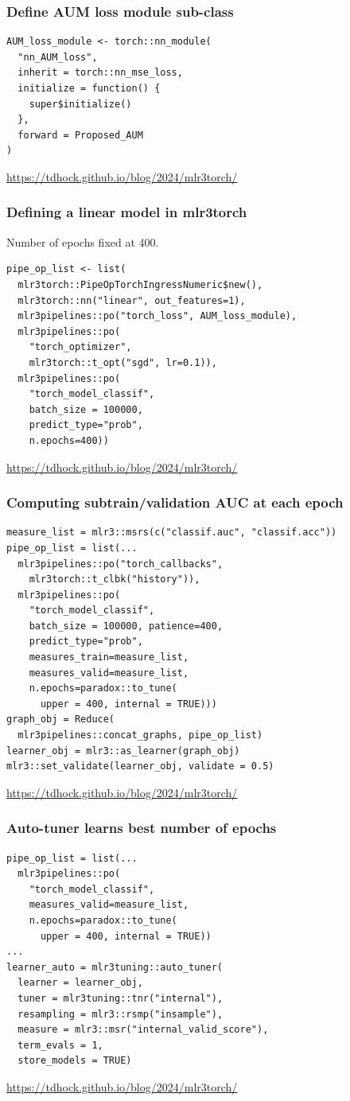 \documentclass{beamer}
\begin{document}
\begin{frame}[fragile]
  \frametitle{Define AUM loss module sub-class}
\begin{verbatim}
AUM_loss_module <- torch::nn_module(
  "nn_AUM_loss",
  inherit = torch::nn_mse_loss,
  initialize = function() {
    super$initialize()
  },
  forward = Proposed_AUM
)
\end{verbatim}
  \url{https://tdhock.github.io/blog/2024/mlr3torch/}
\end{frame}


\begin{frame}[fragile]
  \frametitle{Defining a linear model in mlr3torch}
Number of epochs fixed at 400.
\begin{verbatim}
pipe_op_list <- list(
  mlr3torch::PipeOpTorchIngressNumeric$new(),
  mlr3torch::nn("linear", out_features=1),
  mlr3pipelines::po("torch_loss", AUM_loss_module),
  mlr3pipelines::po(
    "torch_optimizer",
    mlr3torch::t_opt("sgd", lr=0.1)),
  mlr3pipelines::po(
    "torch_model_classif",
    batch_size = 100000,
    predict_type="prob",
    n.epochs=400))
\end{verbatim}
  \url{https://tdhock.github.io/blog/2024/mlr3torch/}
\end{frame}

\begin{frame}[fragile]
  \frametitle{Computing subtrain/validation AUC at each epoch}
\begin{verbatim}
measure_list = mlr3::msrs(c("classif.auc", "classif.acc"))
pipe_op_list = list(...
  mlr3pipelines::po("torch_callbacks",
    mlr3torch::t_clbk("history")),
  mlr3pipelines::po(
    "torch_model_classif",
    batch_size = 100000, patience=400,
    predict_type="prob",
    measures_train=measure_list,
    measures_valid=measure_list,
    n.epochs=paradox::to_tune(
      upper = 400, internal = TRUE)))
graph_obj = Reduce(
  mlr3pipelines::concat_graphs, pipe_op_list)
learner_obj = mlr3::as_learner(graph_obj)
mlr3::set_validate(learner_obj, validate = 0.5)
\end{verbatim}
  \url{https://tdhock.github.io/blog/2024/mlr3torch/}
\end{frame}

\begin{frame}[fragile]
  \frametitle{Auto-tuner learns best number of epochs}
\begin{verbatim}
pipe_op_list = list(...
  mlr3pipelines::po(
    "torch_model_classif",
    measures_valid=measure_list,
    n.epochs=paradox::to_tune(
      upper = 400, internal = TRUE))
...
learner_auto = mlr3tuning::auto_tuner(
  learner = learner_obj,
  tuner = mlr3tuning::tnr("internal"),
  resampling = mlr3::rsmp("insample"),
  measure = mlr3::msr("internal_valid_score"),
  term_evals = 1,
  store_models = TRUE)
\end{verbatim}
  \url{https://tdhock.github.io/blog/2024/mlr3torch/}
\end{frame}
\end{document}

